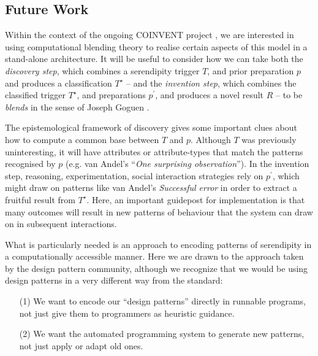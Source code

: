 \subsection{Future Work} \label{sec:futurework} \label{sec:hatching}

Within the context of the ongoing COINVENT project \cite{coinvent14},
we are interested in using computational blending theory to realise
certain aspects of this model in a stand-alone architecture.
%
It will be useful to consider how we can take both the \emph{discovery
  step}, which combines a serendipity trigger $T$, and prior
preparation $p$ and produces a classification $T^{\star}$ -- and the
\emph{invention step}, which combines the classified trigger
$T^{\star}$, and preparations $p^{\prime}$, and produces a novel
result $R$ -- to be \emph{blends} in the sense of Joseph Goguen
\citeyear{goguen1999introduction}.  

The epistemological framework of discovery gives some important clues
about how to compute a common base between $T$ and $p$.  Although $T$
was previously uninteresting, it will have attributes or
attribute-types that match the patterns recognised by $p$ (e.g. van
Andel's  \citeyear{van1994anatomy} ``\emph{One surprising observation}'').
%
In the invention step, reasoning, experimentation, social interaction
strategies rely on $p^{\prime}$, which might draw on patterns like van
Andel's \emph{Successful error} in order to extract a fruitful result
from $T^{\star}$.  Here, an important guidepost for implementation is
that many outcomes will result in new patterns of behaviour that the
system can draw on in subsequent interactions.

What is particularly needed is an approach to encoding patterns of
serendipity in a computationally accessible manner.  Here we are drawn
to the approach taken by the design pattern community, although we
recognize that we would be using design patterns in a very different
way from the standard: 
\begin{itemize}
\item[(1)] We want to encode our ``design patterns'' directly in
  runnable programs, not just give them to programmers as heuristic
  guidance.
\item[(2)] We want the automated programming system to generate new
  patterns, not just apply or adapt old ones.
\end{itemize}

